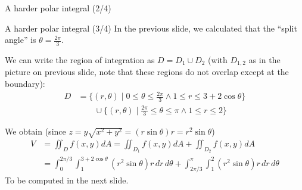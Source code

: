 \begin{frame}{A harder polar integral (2/4)}
\begin{minipage}{0.45\textwidth}
            \end{minipage}
\end{frame}




\begin{frame}{A harder polar integral (3/4)}
    \footnotesize
                In the previous slide, we calculated that the ``split angle'' is $\theta=\frac{2\pi}{3}$.  

            We can write the region of integration as $D=D_1\cup D_2$ (with $D_{1,2}$ as in the picture on previous slide, note that these regions do not overlap except at the boundary):
            \begin{align*}D &=\{(r,\theta) \mid 0\leq\theta\leq\frac{2\pi}{3} \land 1\leq r\leq 3+2\cos\theta \}\\&\qquad\cup\{(r,\theta) \mid \frac{2\pi}{3}\leq\theta\leq\pi \land 1\leq r\leq2\}\end{align*}

            We obtain (since $z=y\sqrt{x^2+y^2}=(r\sin\theta)r=r^2\sin\theta$) \begin{align*}V&=\iint_{D}f(x,y)dA=\iint_{D_1}f(x,y)dA+\iint_{D_2}f(x,y)dA\\&=\int_0^{2\pi/3}\int_1^{3+2\cos\theta}(r^2\sin\theta)r\,dr\,d\theta+\int_{2\pi/3}^{\pi}\int_{1}^2(r^2\sin\theta) r\,dr\,d\theta\end{align*}
            To be computed in the next slide.

\end{frame}

